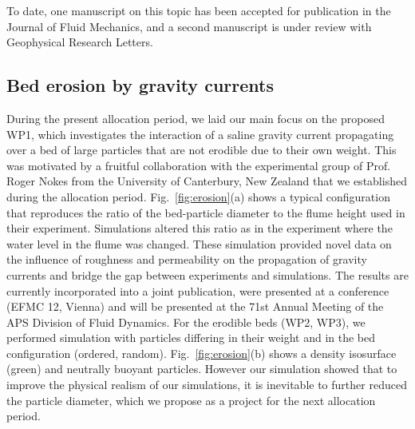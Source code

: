 \documentclass[11pt]{article}
\begin{document}
To date, one manuscript on this topic has been accepted for publication in the Journal of Fluid Mechanics, and a second manuscript is under review with Geophysical Research Letters.
\subsection*{Bed erosion by gravity currents}

During the present allocation period, we laid our main focus on the proposed WP1, which investigates the interaction of a saline gravity current propagating over a bed of large particles that are  not erodible due to their own weight. This was motivated by a fruitful collaboration with the experimental group of Prof. Roger Nokes  from the University of Canterbury, New Zealand that we established during the allocation period. Fig.~\ref{fig:erosion}(a) shows a typical configuration that reproduces the ratio  of the  bed-particle diameter to the flume height used in their experiment. Simulations  altered this ratio as in the experiment where the water level in the flume was changed. These simulation provided novel data on the influence of roughness and permeability on the propagation of gravity currents and  bridge the gap between experiments and simulations. The  results are currently incorporated into a joint publication, were presented at a conference (EFMC 12, Vienna) and will be presented at the 71st Annual Meeting of the APS Division of Fluid Dynamics. For the erodible beds (WP2, WP3), we performed simulation with particles differing in their weight and in the bed configuration (ordered, random).  Fig.~\ref{fig:erosion}(b) shows a density isosurface (green) and neutrally buoyant particles. However our simulation showed that to improve the physical realism of  our simulations, it is inevitable to further reduced the particle diameter, which we propose as a project for the next allocation period.  
\end{document}
